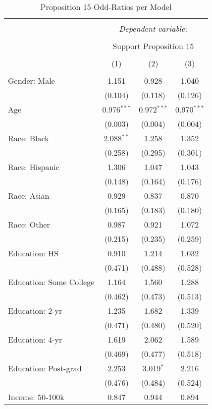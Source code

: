 
\begin{table}[!htbp] \centering 
  \caption{Proposition 15 Odd-Ratios per Model} 
  \label{} 
\footnotesize 
\begin{tabular}{@{\extracolsep{5pt}}lccc} 
\\[-1.8ex]\hline 
\hline \\[-1.8ex] 
 & \multicolumn{3}{c}{\textit{Dependent variable:}} \\ 
\cline{2-4} 
\\[-1.8ex] & \multicolumn{3}{c}{Support Proposition 15} \\ 
\\[-1.8ex] & (1) & (2) & (3)\\ 
\hline \\[-1.8ex] 
 Gender: Male & 1.151 & 0.928 & 1.040 \\ 
  & (0.104) & (0.118) & (0.126) \\ 
  Age & 0.976$^{***}$ & 0.972$^{***}$ & 0.970$^{***}$ \\ 
  & (0.003) & (0.004) & (0.004) \\ 
  Race: Black & 2.088$^{**}$ & 1.258 & 1.352 \\ 
  & (0.258) & (0.295) & (0.301) \\ 
  Race: Hispanic & 1.306 & 1.047 & 1.043 \\ 
  & (0.148) & (0.164) & (0.176) \\ 
  Race: Asian & 0.929 & 0.837 & 0.870 \\ 
  & (0.165) & (0.183) & (0.180) \\ 
  Race: Other & 0.987 & 0.921 & 1.072 \\ 
  & (0.215) & (0.235) & (0.259) \\ 
  Education: HS & 0.910 & 1.214 & 1.032 \\ 
  & (0.471) & (0.488) & (0.528) \\ 
  Education: Some College & 1.164 & 1.560 & 1.288 \\ 
  & (0.462) & (0.473) & (0.513) \\ 
  Education: 2-yr & 1.235 & 1.682 & 1.339 \\ 
  & (0.471) & (0.480) & (0.520) \\ 
  Education: 4-yr & 1.619 & 2.062 & 1.589 \\ 
  & (0.469) & (0.477) & (0.518) \\ 
  Education: Post-grad & 2.253 & 3.019$^{*}$ & 2.216 \\ 
  & (0.476) & (0.484) & (0.524) \\ 
  Income: 50-100k & 0.847 & 0.944 & 0.894 \\ 

\end{tabular}
\end{table}

